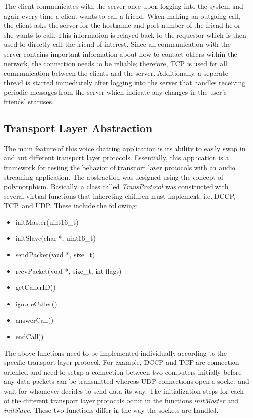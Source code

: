\documentclass[letterpaper, 9 pt, balance, conference]{ieeeconf}
\begin{document}
The client communicates with the server once upon logging into the system and again
every time a client wants to call a friend.  When making an outgoing call,
the client asks the server for the hostname and port number of the friend he or
she wants to call.  This information is relayed back to the requestor which is then
used to directly call the friend of interest.  Since all communication with the
server contains important information about how to contact others within the 
network, the connection needs to be reliable; therefore, TCP is used for all 
communication between the clients and the server. Additionally, a seperate thread
is started immediately after logging into the server that handles receiving
periodic messages from the server which indicate any changes in the user's friends'
statuses. 


\subsection{Transport Layer Abstraction}
\label{subsec:transport_abs}

The main feature of this voice chatting application is its ability to easily 
swap in and out different transport layer protocols.  Essentially, this application
is a framework for testing the behavior of transport layer protocols with an
audio streaming application.  The abstraction was designed using the concept of
polymorphism.  Basically, a class called \textit{TransProtocol} was constructed
with several virtual functions that inhereting children must implement, i.e. DCCP,
TCP, and UDP.  These include the following:

\begin{itemize}
   \item{initMaster(uint16\_t)}
   \item{initSlave(char *, uint16\_t)}
   \item{sendPacket(void *, size\_t)}
   \item{recvPacket(void *, size\_t, int flags)}
   \item{getCallerID()}
   \item{ignoreCaller()}
   \item{answerCall()}
   \item{endCall()}
\end{itemize}

The above functions need to be implemented individually according to the specific
transport layer protocol.  For example, DCCP and TCP are connection-oriented and
need to setup a connection between two computers initially before any data packets 
can be transmitted whereas UDP connections open a socket and wait for 
whomever decides to send data its way.  The initialization steps for each of the
different transport layer protocols occur in the functions \textit{initMaster} and
\textit{initSlave}.  These two functions differ in the way the sockets are handled.
\end{document}
